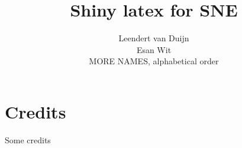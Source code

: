 \documentclass[a4paper,11pt] {article}
\title{Shiny latex for SNE}
\author{
Leendert van Duijn\\
Esan Wit\\
MORE NAMES, alphabetical order\\}
\begin{document}
\maketitle
\newpage






\appendix
\section{Credits}
Some credits
\end{document}
